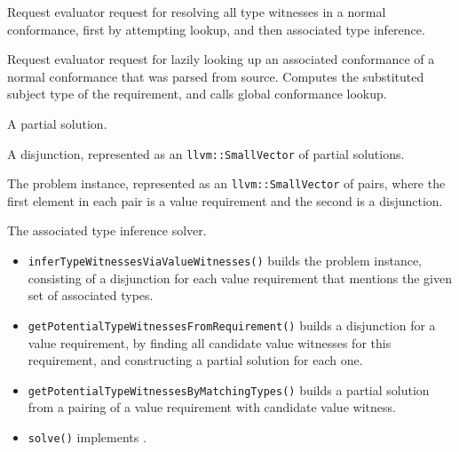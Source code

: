 \documentclass[../generics]{subfiles}
\begin{document}
Request evaluator request for resolving all type witnesses in a normal conformance, first by attempting lookup, and then associated type inference.

Request evaluator request for lazily looking up an associated conformance of a normal conformance that was parsed from source. Computes the substituted subject type of the requirement, and calls global conformance lookup.

A partial solution.

A disjunction, represented as an \verb|llvm::SmallVector| of partial solutions.

The problem instance, represented as an \verb|llvm::SmallVector| of pairs, where the first element in each pair is a value requirement and the second is a disjunction.

The associated type inference solver.
\begin{itemize}
\item \texttt{inferTypeWitnessesViaValueWitnesses()} builds the problem instance, consisting of a disjunction for each value requirement that mentions the given set of associated types.
\item \texttt{getPotentialTypeWitnessesFromRequirement()} builds a disjunction for a value requirement, by finding all candidate value witnesses for this requirement, and constructing a partial solution for each one.
\item \texttt{getPotentialTypeWitnessesByMatchingTypes()} builds a partial solution from a pairing of a value requirement with candidate value witness.
\item \texttt{solve()} implements .
\end{itemize}
\end{document}
